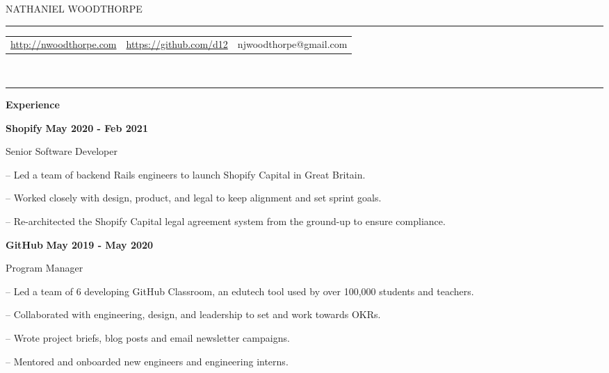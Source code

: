 \documentclass[12pt]{extarticle}
\begin{document}
{\selectfont
    \begin{center}
        {\LARGE {NATHANIEL WOODTHORPE}}
        \\
        \vspace{0.52cm}
        \hrule
        \vspace{0.4cm}

        \setlength{\tabcolsep}{12pt}
        \begin{tabular}{c c c}
            \href{http://nwoodthorpe.com}{http://nwoodthorpe.com} & \href{https://github.com/d12}{https://github.com/d12} & njwoodthorpe@gmail.com
        \end{tabular}
        \vspace{0.22cm}
        \\
        \hrule
    \end{center}
    \vspace{0.5cm}
    {\large \textbf{Experience}}\\
    
    \vspace{-0.2cm}
    {\indent
        \textbf{Shopify} \hfill \textbf{May 2020 - Feb 2021}

        Senior Software Developer

        \begin{compactitem}
            \setlength{\itemindent}{0.5cm}
            \item[--] Led a team of backend Rails engineers to launch Shopify Capital in Great Britain. 
            \item[--] Worked closely with design, product, and legal to keep alignment and set sprint goals.
            \item[--] Re-architected the Shopify Capital legal agreement system from the ground-up to ensure compliance.
        \end{compactitem}
    }

    \vspace{0.3cm}
    {\indent
        \textbf{GitHub} \hfill \textbf{May 2019 - May 2020}

        Program Manager

        \begin{compactitem}
            \setlength{\itemindent}{0.5cm}
            \item[--] Led a team of 6 developing GitHub Classroom, an edutech tool used by over 100,000 students and teachers.
            \item[--] Collaborated with engineering, design, and leadership to set and work towards OKRs.
            \item[--] Wrote project briefs, blog posts and email newsletter campaigns.
            \item[--] Mentored and onboarded new engineers and engineering interns.
        \end{compactitem}
    }

}
\end{document}
